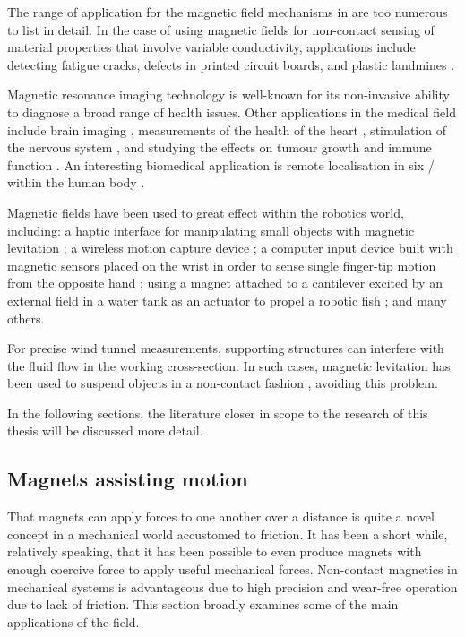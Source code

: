 \documentclass[11pt,a4paper]{memoir}
\begin{document}
The range of application for the magnetic field mechanisms in  are too numerous to list in detail.
In the case of using magnetic fields for non-contact sensing of material properties that involve variable conductivity, applications include detecting fatigue cracks, defects in printed circuit boards, and plastic landmines \cite{mukhopadhyay2005}.

Magnetic resonance imaging technology is well-known for its non-invasive ability to diagnose a broad range of health issues. Other applications in the medical field include brain imaging \cite{sekino2005,gjini2005,lu2008-ietm,demachi2008}, measurements of the health of the heart \cite{lim2009-ietm}, stimulation of the nervous system \cite{darabant2009}, and studying the effects on tumour growth and immune function \cite{yamaguchi2005-ietm}.
An interesting biomedical application is remote localisation in six \dofs/ within the human body \cite{yang2009-ietm}.

Magnetic fields have been used to great effect within the robotics world, including:
a haptic interface for manipulating small objects with magnetic levitation \cite{vanwest2007};
a wireless motion capture device \cite{hashi2005};
a computer input device built with magnetic sensors placed on the wrist in order to sense single finger-tip motion from the opposite hand \cite{han2008};
using a magnet attached to a cantilever excited by an external field in a water tank as an actuator to propel a robotic fish \cite{tomie2005};
and many others.

For precise wind tunnel measurements, supporting structures can interfere with the fluid flow in the working cross-section.
In such cases, magnetic levitation has been used to suspend objects in a non-contact fashion \cite{higuchi2008}, avoiding this problem.

In the following sections, the literature closer in scope to the research of this thesis will be discussed more detail.


\subsection{Magnets assisting motion}

That magnets can apply forces to one another over a distance is quite a novel concept in a mechanical world accustomed to friction.
It has been a short while, relatively speaking, that it has been possible to even produce magnets with enough coercive force to apply useful mechanical forces.
Non-contact magnetics in mechanical systems is advantageous due to high precision and wear-free operation due to lack of friction.
This section broadly examines some of the main applications of the field.
\end{document}
